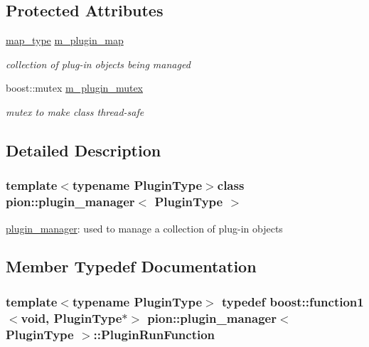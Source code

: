 \subsection*{Protected Attributes}
\begin{DoxyCompactItemize}
\item 
\hyperlink{classpion_1_1plugin__manager_1_1map__type}{map\-\_\-type} \hyperlink{classpion_1_1plugin__manager_a6022dd5905f5079523844d68cd89977d}{m\-\_\-plugin\-\_\-map}
\begin{DoxyCompactList}\small\item\em collection of plug-\/in objects being managed \end{DoxyCompactList}\item 
boost\-::mutex \hyperlink{classpion_1_1plugin__manager_a4ce56259eca75c8c88bdc4f778526ec4}{m\-\_\-plugin\-\_\-mutex}
\begin{DoxyCompactList}\small\item\em mutex to make class thread-\/safe \end{DoxyCompactList}\end{DoxyCompactItemize}


\subsection{Detailed Description}
\subsubsection*{template$<$typename Plugin\-Type$>$class pion\-::plugin\-\_\-manager$<$ Plugin\-Type $>$}

\hyperlink{classpion_1_1plugin__manager}{plugin\-\_\-manager}\-: used to manage a collection of plug-\/in objects 

\subsection{Member Typedef Documentation}
\hypertarget{classpion_1_1plugin__manager_a275b88a2c9f7c89d6d737c1b444be8b2}{
\subsubsection[{Plugin\-Run\-Function}]{\setlength{\rightskip}{0pt plus 5cm}template$<$typename Plugin\-Type$>$ typedef boost\-::function1$<$void, Plugin\-Type$\ast$$>$ {\bf pion\-::plugin\-\_\-manager}$<$ Plugin\-Type $>$\-::{\bf Plugin\-Run\-Function}}}\label{classpion_1_1plugin__manager_a275b88a2c9f7c89d6d737c1b444be8b2}


